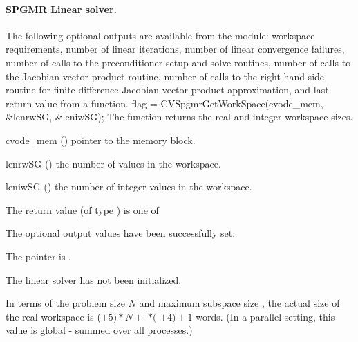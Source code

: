 %
%
\noindent\paragraph{\bf SPGMR Linear solver.}
The following optional outputs are available from the {\cvspgmr} module:
workspace requirements, number of linear iterations,
number of linear convergence failures, number of calls to the preconditioner
setup and solve routines, number of calls to the Jacobian-vector product routine, number of 
calls to the right-hand side routine for finite-difference Jacobian-vector product approximation,
and last return value from a {\cvspgmr} function.
{
  flag = CVSpgmrGetWorkSpace(cvode\_mem, \&lenrwSG, \&leniwSG);
}
{
  The function  returns the
  {\cvspgmr} real and integer workspace sizes.
}
{
  \begin{args}
  \item[cvode\_mem] ()
    pointer to the {\cvodes} memory block.
  \item[lenrwSG] ()
    the number of  values in the {\cvspgmr} workspace.
  \item[leniwSG] ()
    the number of integer values in the {\cvspgmr} workspace.
  \end{args}
}
{
  The return value  (of type ) is one of
  \begin{args}
  \item[\Id{CVSPGMR\_SUCCESS}] 
    The optional output values have been successfully set.
  \item[\Id{CVSPGMR\_MEM\_NULL}]
    The  pointer is .
  \item[\Id{CVSPGMR\_LMEM\_NULL}]
    The {\cvspgmr} linear solver has not been initialized.
  \end{args}
}
{
  In terms of the problem size $N$ and maximum subspace size , 
  the actual size of the real workspace is
  ($+ 5)*N +$  $*($ $ + 4) + 1$ 
  words.  (In a parallel setting, this value is global - summed over
  all processes.)
}
